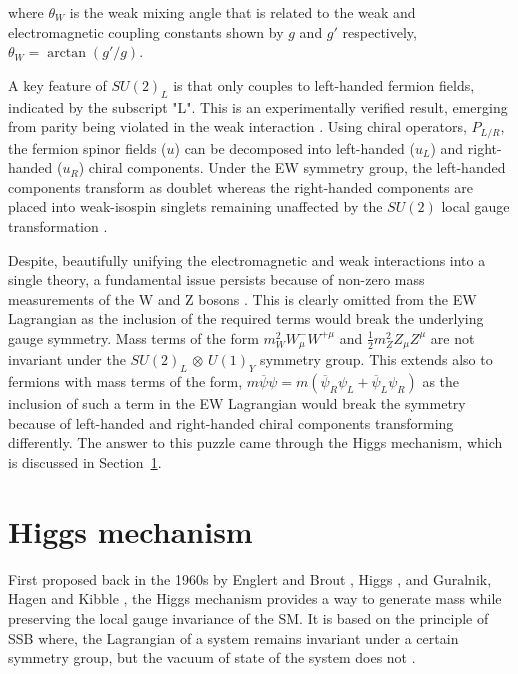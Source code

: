 where $\theta_{W}$ is the weak mixing angle that is related to the weak and electromagnetic coupling constants shown by $g$ and $g'$ respectively, $\theta_{W} = \arctan(g'/g)$.

A key feature of $SU(2)_L$ is that only couples to left-handed fermion fields, indicated by the subscript "L". This is an experimentally verified result, emerging from parity being violated in the weak interaction \cite{ParityViolation}. Using chiral operators, $P_{L/R}$, the fermion spinor fields ($u$) can be decomposed into left-handed ($u_{L}$) and right-handed ($u_{R}$) chiral components. Under the EW symmetry group, the left-handed components transform as doublet whereas the right-handed components are placed into weak-isospin singlets remaining unaffected by the $SU(2)$ local gauge transformation \cite{Parity_LHanded}.

Despite, beautifully unifying the electromagnetic and weak interactions into a single theory, a fundamental issue persists because of non-zero mass measurements of the W and Z bosons \cite{W_Z_MassMeasurements_1,W_Z_MassMeasurements_2}. This is clearly omitted from the EW Lagrangian as the inclusion of the required terms would break the underlying gauge symmetry. Mass terms of the form ${m_{W}^2 W_{\mu}^{-} W^{+\mu}}$ and $\frac{1}{2} m_{Z}^{2} Z_{\mu} Z^{\mu}$ are not invariant under the $SU(2)_{L}$ $\otimes$ $U(1)_{Y}$ symmetry group. This extends also to fermions with mass terms of the form, $m\overline{\psi}\psi = m(\overline{\psi}_{R}\psi_{L} + \overline{\psi}_{L}\psi_{R})$ as the inclusion of such a term in the EW Lagrangian would break the symmetry because of left-handed and right-handed chiral components transforming differently. The answer to this puzzle came through the Higgs mechanism, which is discussed in Section~\ref{Section:Introduction_HiggsMechanism}.

\section{Higgs mechanism}
\label{Section:Introduction_HiggsMechanism}
First proposed back in the 1960s by Englert and Brout \cite{Englert_Brout}, Higgs \cite{Higgs_2}, and Guralnik, Hagen and Kibble \cite{Guralnik_Hagen_Kibble,Kibble_1}, the Higgs mechanism provides a way to generate mass while preserving the local gauge invariance of the SM. It is based on the principle of \ac{SSB} where, the Lagrangian of a system remains invariant under a certain symmetry group, but the vacuum of state of the system does not \cite{SSB_Definition}. 

